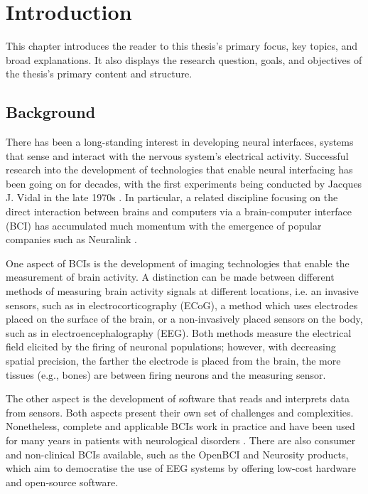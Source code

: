 \chapter{Introduction}
\graphicspath{{Chapter1/Figs/}{Chapter1/Figs/}}

This chapter introduces the reader to this thesis's primary focus, key topics, and broad explanations. It also displays the research question, goals, and objectives of the thesis's primary content and structure.

\section{Background}
\label{chapter1-background}

There has been a long-standing interest in developing neural interfaces, systems that sense and interact with the nervous system's electrical activity. Successful research into the development of technologies that enable neural interfacing has been going on for decades, with the first experiments being conducted by Jacques J. Vidal in the late 1970s \citep{vidal_real-time_1977}. In particular, a related discipline focusing on the direct interaction between brains and computers via a brain-computer interface (BCI) has accumulated much momentum with the emergence of popular companies such as Neuralink \citep{mor_brain-computer_2021}.

One aspect of BCIs is the development of imaging technologies that enable the measurement of brain activity. A distinction can be made between different methods of measuring brain activity signals at different locations, i.e. an invasive sensors, such as in electrocorticography (ECoG), a method which uses electrodes placed on the surface of the brain, or a non-invasively placed sensors on the body, such as in electroencephalography (EEG). Both methods measure the electrical field elicited by the firing of neuronal populations; however, with decreasing spatial precision, the farther the electrode is placed from the brain, the more tissues (e.g., bones) are between firing neurons and the measuring sensor.

The other aspect is the development of software that reads and interprets data from sensors. Both aspects present their own set of challenges and complexities. Nonetheless, complete and applicable BCIs work in practice and have been used for many years in patients with neurological disorders \citep{braingate_publications_nodate}. There are also consumer and non-clinical BCIs available, such as the OpenBCI and Neurosity products, which aim to democratise the use of EEG systems by offering low-cost hardware and open-source software.

